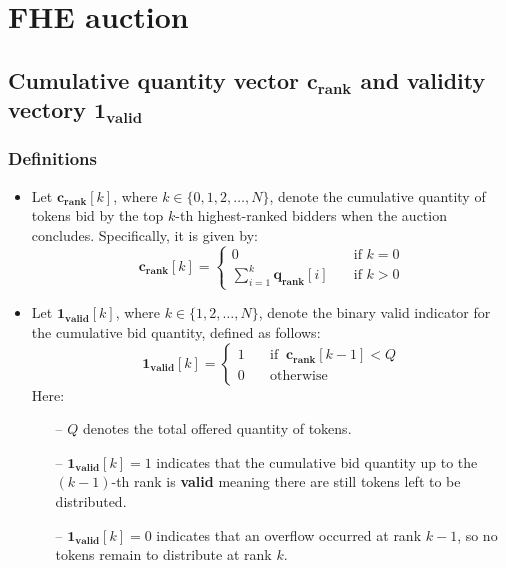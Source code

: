 \section{FHE auction}


\subsection{Cumulative quantity vector $\mathbf{c_{rank}}$ and validity vectory $\mathbf{1_{valid}}$} 

\subsubsection{Definitions}
\begin{itemize}
\item Let $\mathbf{c_{rank}}[k]$, where $k \in \{0, 1, 2, \dots, N\}$, denote the cumulative quantity of tokens bid by the top $k$-th highest-ranked bidders when the auction concludes. Specifically, it is given by:
\begin{equation*}
    \mathbf{c_{rank}}[k] = 
    \begin{cases}
        0 \quad &\text{if } k = 0
        \\
        \sum_{i=1}^{k} \mathbf{q_{rank}}[i] \quad &\text{if } k > 0
    \end{cases}
\end{equation*}

\item Let $\mathbf{1_{valid}}[k]$, where $k \in \{1, 2, \dots, N\}$, denote the binary valid indicator for the cumulative bid quantity, defined as follows:
\begin{equation*}
    \mathbf{1_{valid}}[k] = 
    \begin{cases}
        1 \quad & \text{if } \ \mathbf{c_{rank}}[k-1] < Q \\
        0 \quad & \text{otherwise}
    \end{cases}
\end{equation*}
Here:
\begin{itemize}
    \item[--] $Q$ denotes the total offered quantity of tokens.
    \item[--] $\mathbf{1_{valid}}[k] = 1$ indicates that the cumulative bid quantity up to the $(k-1)$-th rank is \textbf{valid} meaning there are still tokens left to be distributed.
    \item[--] $\mathbf{1_{valid}}[k] = 0$ indicates that an overflow occurred at rank $k-1$, so no tokens remain to distribute at rank $k$.
\end{itemize}
\end{itemize}

